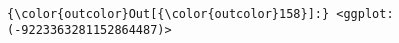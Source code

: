 \documentclass[11pt]{article}
\begin{document}
    \begin{center}
    \end{center}
    { \hspace*{\fill} \\}
    
\begin{Verbatim}[commandchars=\\\{\}]
{\color{outcolor}Out[{\color{outcolor}158}]:} <ggplot: (-9223363281152864487)>
\end{Verbatim}
            

    
    
    
    
\end{document}

